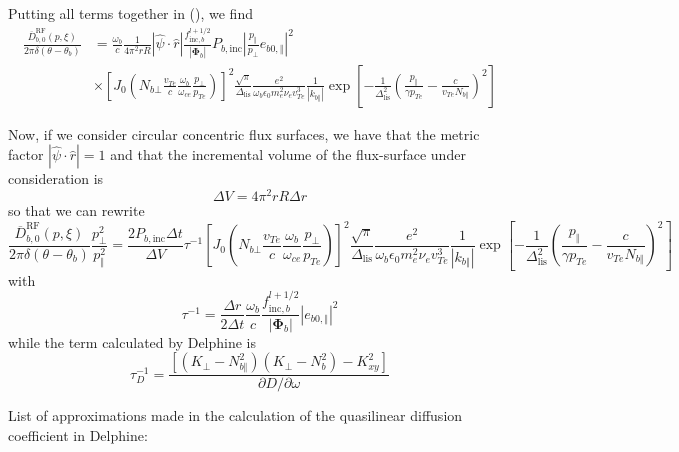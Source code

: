 Putting all terms together in (), we find%
\begin{align}
\frac{\overline{D}_{b,0}^{\text{RF}}(p,\xi)}{2\pi\delta\left(  \theta
-\theta_{b}\right)  }  &  =\frac{\omega_{b}}{c}\frac{1}{4\pi^{2}rR}\left\vert
\widehat{\psi}\cdot\widehat{r}\right\vert \frac{f_{\text{inc},b}^{l+1/2}%
}{\left\vert \mathbf{\Phi}_{b}\right\vert }P_{b,\text{inc}}\left\vert
\frac{p_{\Vert}}{p_{\bot}}e_{b0,\Vert}\right\vert ^{2}\\
&  \times\left[  J_{0}\left(  N_{b\bot}\frac{v_{Te}}{c}\frac{\omega_{b}%
}{\omega_{ce}}\frac{p_{\bot}}{p_{Te}}\right)  \right]  ^{2}\frac{\sqrt{\pi}%
}{\Delta_{\text{lis}}}\frac{e^{2}}{\omega_{b}\epsilon_{0}m_{e}^{2}\nu
_{e}v_{Te}^{3}}\frac{1}{\left\vert k_{b\Vert}\right\vert }\exp\left[
-\frac{1}{\Delta_{\text{lis}}^{2}}\left(  \frac{p_{\Vert}}{\gamma p_{Te}%
}-\frac{c}{v_{Te}N_{b\Vert}}\right)  ^{2}\right]
\end{align}


Now, if we consider circular concentric flux surfaces, we have that the metric
factor $\left\vert \widehat{\psi}\cdot\widehat{r}\right\vert =1$ and that the
incremental volume of the flux-surface under consideration is%
\[
\Delta V=4\pi^{2}rR\Delta r
\]
so that we can rewrite%
\begin{equation}
\frac{\overline{D}_{b,0}^{\text{RF}}(p,\xi)}{2\pi\delta\left(  \theta
-\theta_{b}\right)  }\frac{p_{\bot}^{2}}{p_{\Vert}^{2}}=\frac{2P_{b,\text{inc}%
}\Delta t}{\Delta V}\tau^{-1}\left[  J_{0}\left(  N_{b\bot}\frac{v_{Te}}%
{c}\frac{\omega_{b}}{\omega_{ce}}\frac{p_{\bot}}{p_{Te}}\right)  \right]
^{2}\frac{\sqrt{\pi}}{\Delta_{\text{lis}}}\frac{e^{2}}{\omega_{b}\epsilon
_{0}m_{e}^{2}\nu_{e}v_{Te}^{3}}\frac{1}{\left\vert k_{b\Vert}\right\vert }%
\exp\left[  -\frac{1}{\Delta_{\text{lis}}^{2}}\left(  \frac{p_{\Vert}}{\gamma
p_{Te}}-\frac{c}{v_{Te}N_{b\Vert}}\right)  ^{2}\right]
\end{equation}
with%
\[
\tau^{-1}=\frac{\Delta r}{2\Delta t}\frac{\omega_{b}}{c}\frac{f_{\text{inc}%
,b}^{l+1/2}}{\left\vert \mathbf{\Phi}_{b}\right\vert }\left\vert e_{b0,\Vert
}\right\vert ^{2}%
\]
while the term calculated by Delphine is
\[
\tau_{D}^{-1}=\frac{\left[  \left(  K_{\bot}-N_{b\Vert}^{2}\right)  \left(
K_{\bot}-N_{b}^{2}\right)  -K_{xy}^{2}\right]  }{\partial D/\partial\omega}%
\]


List of approximations made in the calculation of the quasilinear diffusion
coefficient in Delphine:


